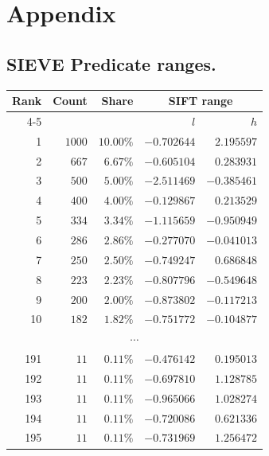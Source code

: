 \chapter{Appendix}

\section{SIEVE Predicate ranges.}\label{sec:sieve-ranges}

\begin{center}
\renewcommand{\arraystretch}{1.12}
    \begin{tabular}{rrrrr}
        \toprule
        Rank & Count & Share & \multicolumn{2}{c}{\textsc{SIFT} range} \\
        \cmidrule(lr){4-5}
             &       &       & \(l\) & \(h\) \\
        \midrule
        1   & \(1000\) & \(10.00\%\) & \(-0.702644\) & \( 2.195597\) \\
        2   & \(667\)  & \( 6.67\%\) & \(-0.605104\) & \( 0.283931\) \\
        3   & \(500\)  & \( 5.00\%\) & \(-2.511469\) & \(-0.385461\) \\
        4   & \(400\)  & \( 4.00\%\) & \(-0.129867\) & \( 0.213529\) \\
        5   & \(334\)  & \( 3.34\%\) & \(-1.115659\) & \(-0.950949\) \\
        6   & \(286\)  & \( 2.86\%\) & \(-0.277070\) & \(-0.041013\) \\
        7   & \(250\)  & \( 2.50\%\) & \(-0.749247\) & \( 0.686848\) \\
        8   & \(223\)  & \( 2.23\%\) & \(-0.807796\) & \(-0.549648\) \\
        9   & \(200\)  & \( 2.00\%\) & \(-0.873802\) & \(-0.117213\) \\
        10  & \(182\)  & \( 1.82\%\) & \(-0.751772\) & \(-0.104877\) \\
        \midrule
        \multicolumn{5}{c}{\(\cdots\)} \\
        \midrule
        191 & \(11\)   & \( 0.11\%\) & \(-0.476142\) & \( 0.195013\) \\
        192 & \(11\)   & \( 0.11\%\) & \(-0.697810\) & \( 1.128785\) \\
        193 & \(11\)   & \( 0.11\%\) & \(-0.965066\) & \( 1.028274\) \\
        194 & \(11\)   & \( 0.11\%\) & \(-0.720086\) & \( 0.621336\) \\
        195 & \(11\)   & \( 0.11\%\) & \(-0.731969\) & \( 1.256472\) \\

\end{tabular}
\end{center}
